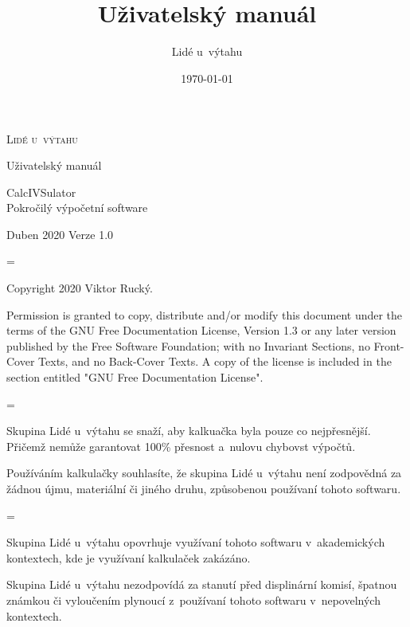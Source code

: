 \documentclass[a5paper,8pt,twoside]{extarticle}
\title{\appname{}\\Uživatelský manuál}
\author{Lidé u~výtahu}
\date{\today}
\newcommand*{\appname}{CalcIVSulator}
\newenvironment{warningBox}
  {\par\begin{mdframed}[linewidth=1pt,linecolor=black]%
    \begin{list}{}{\leftmargin=1cm
                   \labelwidth=\leftmargin}\item[\Large\warning]}
  {\end{list}\end{mdframed}\par}
\newenvironment{infoBox}
  {\par\begin{mdframed}[linewidth=1pt,linecolor=black]%
    \begin{list}{}{\leftmargin=1cm
                   \labelwidth=\leftmargin}\item[\Large\lefthand]}
  {\end{list}\end{mdframed}\par}
\newcommand*\joinBox{\vspace{-0.9em}}
\begin{document}
    \renewcommand\thesubsubsection{\Alph{subsubsection}}
    \setlength{\parindent}{0em}
    \setlength{\parskip}{1em}
    \begin{titlepage}
        \begin{center}
            {\LARGE \textsc{Lidé u~výtahu}}

            {\large Uživatelský manuál}
            
            {\Huge \appname{}}\\
            \vspace{1.5mm}
            {\huge Pokročilý výpočetní software}\\
        \end{center}
        {\large Duben 2020} \hfill {\large Verze 1.0}
    \end{titlepage}
    
    \thispagestyle{empty}
    \begin{infoBox}
            Copyright \textcopyright{} 2020 Viktor Rucký.

            \foreignlanguage{english}{Permission is granted to copy, distribute and/or modify this document
            under the terms of the GNU Free Documentation License, Version 1.3
            or any later version published by the Free Software Foundation;
            with no Invariant Sections, no Front-Cover Texts, and no Back-Cover Texts.
            A copy of the license is included in the section entitled "GNU
            Free Documentation License".}
    \end{infoBox}
    \joinBox
    \begin{warningBox}
        Skupina Lidé u~výtahu se snaží, aby kalkuačka byla pouze co nejpřesnější. Přičemž nemůže garantovat 100\% přesnost a~nulovu chybovst výpočtů.

        Používáním kalkulačky souhlasíte, že skupina Lidé u~výtahu není zodpovědná za žádnou újmu, materiální či jiného druhu, způsobenou používaní tohoto softwaru.
    \end{warningBox}
    \joinBox
    \begin{warningBox}
        Skupina Lidé u~výtahu opovrhuje využívaní tohoto softwaru v~akademických kontextech, kde je využívaní kalkulaček zakázáno.

        Skupina Lidé u~výtahu nezodpovídá za stanutí před displinární komisí, špatnou známkou či vyloučením plynoucí z~používaní tohoto softwaru v~nepovelných kontextech.
    \end{warningBox}
    
\end{document}
